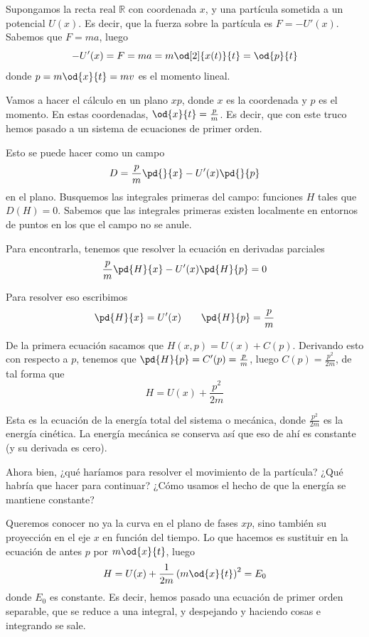 \begin{example}
Supongamos la recta real $ℝ$ con coordenada $x$, y una partícula sometida a un potencial $U(x)$. Es decir, que la fuerza sobre la partícula es $F = -U'(x)$. Sabemos que $F = ma$, luego \[ -U'(x) = F = m a = m \od[2]{x(t)}{t} = \od{p}{t} \] donde $p = m \od{x}{t} = mv$ es el momento lineal.

Vamos a hacer el cálculo en un plano $xp$, donde $x$ es la coordenada y $p$ es el momento. En estas coordenadas, $\od{x}{t} = \frac{p}{m}$. Es decir, que con este truco hemos pasado a un sistema de ecuaciones de primer orden.

Esto se puede hacer como un campo \[ D = \frac{p}{m}\pd{}{x} - U'(x) \pd{}{p} \] en el plano. Busquemos las integrales primeras del campo: funciones $H$ tales que $D(H) = 0$. Sabemos que las integrales primeras existen localmente en entornos de puntos en los que el campo no se anule.

Para encontrarla, tenemos que resolver la ecuación en derivadas parciales \[ \frac{p}{m} \pd{H}{x} - U'(x) \pd{H}{p} = 0 \]

Para resolver eso escribimos \[ \pd{H}{x} = U'(x) \qquad \pd{H}{p} = \frac{p}{m}\]

De la primera ecuación sacamos que $H(x,p) = U(x) + C(p)$. Derivando esto con respecto a $p$, tenemos que $\pd{H}{p} = C'(p) = \frac{p}{m}$, luego $C(p) = \frac{p^2}{2m}$, de tal forma que \[ H = U(x) + \frac{p^2}{2m} \]

Esta es la ecuación de la energía total del sistema o mecánica, donde $\frac{p^2}{2m}$ es la energía cinética. La energía mecánica se conserva así que eso de ahí es constante (y su derivada es cero).

Ahora bien, ¿qué haríamos para resolver el movimiento de la partícula? ¿Qué habría que hacer para continuar? ¿Cómo usamos el hecho de que la energía se mantiene constante?

Queremos conocer no ya la curva en el plano de fases $xp$, sino también su proyección en el eje $x$ en función del tiempo. Lo que hacemos es sustituir en la ecuación de antes $p$ por $m\od{x}{t}$, luego \[ H = U(x) + \frac{1}{2m}\left(m\od{x}{t}\right)^2 = E_0 \] donde $E_0$ es constante. Es decir, hemos pasado una ecuación de primer orden separable, que se reduce a una integral, y despejando y haciendo cosas e integrando se sale.
\end{example}

